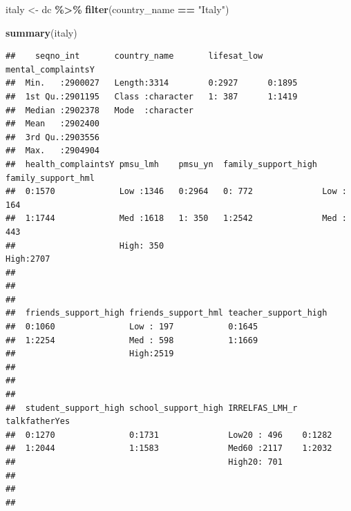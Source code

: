 \documentclass[
]{article}
\newenvironment{Shaded}{\begin{snugshade}}{\end{snugshade}}
\newcommand{\FunctionTok}[1]{\textcolor[rgb]{0.13,0.29,0.53}{\textbf{#1}}}
\newcommand{\NormalTok}[1]{#1}
\newcommand{\OtherTok}[1]{\textcolor[rgb]{0.56,0.35,0.01}{#1}}
\newcommand{\SpecialCharTok}[1]{\textcolor[rgb]{0.81,0.36,0.00}{\textbf{#1}}}
\newcommand{\StringTok}[1]{\textcolor[rgb]{0.31,0.60,0.02}{#1}}
\begin{document}
\begin{Shaded}
\begin{Highlighting}[]
\NormalTok{italy }\OtherTok{\textless{}{-}}\NormalTok{ dc }\SpecialCharTok{\%\textgreater{}\%}
  \FunctionTok{filter}\NormalTok{(country\_name }\SpecialCharTok{==} \StringTok{"Italy"}\NormalTok{)}

\FunctionTok{summary}\NormalTok{(italy)}
\end{Highlighting}
\end{Shaded}

\begin{verbatim}
##    seqno_int       country_name       lifesat_low mental_complaintsY
##  Min.   :2900027   Length:3314        0:2927      0:1895            
##  1st Qu.:2901195   Class :character   1: 387      1:1419            
##  Median :2902378   Mode  :character                                 
##  Mean   :2902400                                                    
##  3rd Qu.:2903556                                                    
##  Max.   :2904904                                                    
##  health_complaintsY pmsu_lmh    pmsu_yn  family_support_high family_support_hml
##  0:1570             Low :1346   0:2964   0: 772              Low : 164         
##  1:1744             Med :1618   1: 350   1:2542              Med : 443         
##                     High: 350                                High:2707         
##                                                                                
##                                                                                
##                                                                                
##  friends_support_high friends_support_hml teacher_support_high
##  0:1060               Low : 197           0:1645              
##  1:2254               Med : 598           1:1669              
##                       High:2519                               
##                                                               
##                                                               
##                                                               
##  student_support_high school_support_high IRRELFAS_LMH_r talkfatherYes
##  0:1270               0:1731              Low20 : 496    0:1282       
##  1:2044               1:1583              Med60 :2117    1:2032       
##                                           High20: 701                 
##                                                                       
##                                                                       
##                                                                       

\end{verbatim}
\end{document}
